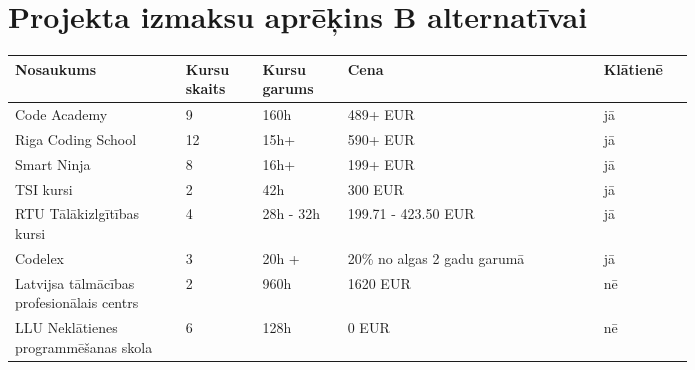 \section{Projekta izmaksu aprēķins B alternatīvai \label{app:pieejamo_kursu_aspkats}}
\begin{table}[!ht]
    \center
    \begin{tabular}{|p{0.2\linewidth}|p{0.09\linewidth}|p{0.1\linewidth}|p{0.3\linewidth}|p{0.1\linewidth}|}
        \hline
        \textbf{Nosaukums} & \textbf{Kursu skaits} & \textbf{Kursu garums} & \textbf{Cena} & \textbf{Klātienē} \\ 
        \hline
        Code Academy & 9 & 160h & 489+ EUR & jā \\
        \hline
        Riga Coding School & 12 & 15h+ & 590+ EUR & jā \\
        \hline
        Smart Ninja & 8 & 16h+ & 199+ EUR & jā \\
        \hline
        TSI kursi & 2 & 42h & 300 EUR & jā \\
        \hline 
        RTU Tālākizlgītības kursi & 4 & 28h - 32h & 199.71 - 423.50 EUR & jā \\
        \hline
        Codelex & 3 & 20h + & 20\% no algas 2 gadu garumā & jā \\
        \hline
        Latvijsa tālmācības profesionālais centrs & 2 & 960h & 1620  EUR & nē \\
        \hline
        LLU Neklātienes programmēšanas skola & 6 & 128h & 0 EUR & nē \\
        \hline
    \end{tabular}
\end{table}
\clearpage
